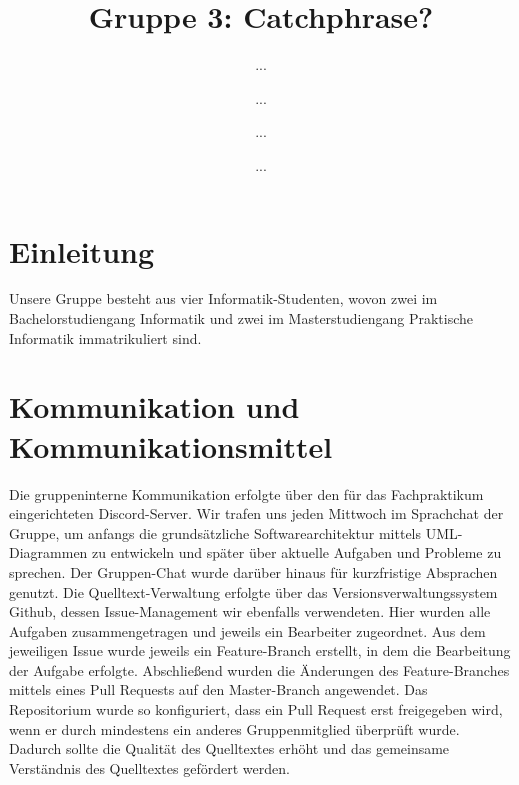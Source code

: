 \documentclass[runningheads]{llncs}
\begin{document}
%
\title{Gruppe 3: Catchphrase?}
%
%
\author{...\and
...\and
...\and
...}
%
%
%
\maketitle              %
%
%
\section{Einleitung}
Unsere Gruppe besteht aus vier Informatik-Studenten, wovon zwei im Bachelorstudiengang Informatik und zwei im Masterstudiengang Praktische Informatik immatrikuliert sind.

\section{Kommunikation und Kommunikationsmittel}
Die gruppeninterne Kommunikation erfolgte über den für das Fachpraktikum eingerichteten Discord-Server. Wir trafen uns jeden Mittwoch im Sprachchat der Gruppe, um anfangs die grundsätzliche Softwarearchitektur mittels UML-Diagrammen zu entwickeln und später über aktuelle Aufgaben und Probleme zu sprechen. Der Gruppen-Chat wurde darüber hinaus für kurzfristige Absprachen genutzt.
Die Quelltext-Verwaltung erfolgte über das Versionsverwaltungssystem Github, dessen Issue-Management wir ebenfalls verwendeten. Hier wurden alle Aufgaben zusammengetragen und jeweils ein Bearbeiter zugeordnet. Aus dem jeweiligen Issue wurde jeweils ein Feature-Branch erstellt, in dem die Bearbeitung der Aufgabe erfolgte. Abschließend wurden die Änderungen des Feature-Branches mittels eines Pull Requests auf den Master-Branch angewendet. Das Repositorium wurde so konfiguriert, dass ein Pull Request erst freigegeben wird, wenn er durch mindestens ein anderes Gruppenmitglied überprüft wurde. Dadurch sollte die Qualität des Quelltextes erhöht und das gemeinsame Verständnis des Quelltextes gefördert werden.
\end{document}
